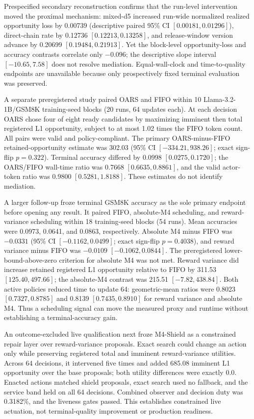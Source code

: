 \documentclass{article}
\begin{document}
Prespecified secondary reconstruction confirms that the run-level intervention moved the proximal mechanism: mixed-d5 increased run-wide normalized realized opportunity loss by 0.00739 (descriptive paired 95\% CI $[0.00181,0.01296]$), direct-chain rate by 0.12736 $[0.12213,0.13258]$, and release-window version advance by 0.20699 $[0.19484,0.21913]$. Yet the block-level opportunity-loss and accuracy contrasts correlate only $-0.096$; the descriptive slope interval $[-10.65,7.58]$ does not resolve mediation. Equal-wall-clock and time-to-quality endpoints are unavailable because only prospectively fixed terminal evaluation was preserved.

A separate preregistered study paired OARS and FIFO within 10 Llama-3.2-1B/GSM8K training-seed blocks (20 runs, 64 updates each). At each decision OARS chose four of eight ready candidates by maximizing imminent then total registered L1 opportunity, subject to at most 1.02 times the FIFO token count. All pairs were valid and policy-compliant. The primary OARS-minus-FIFO retained-opportunity estimate was 302.03 (95\% CI $[-334.21,938.26]$; exact sign-flip $p=0.322$). Terminal accuracy differed by 0.0998 $[0.0275,0.1720]$; the OARS/FIFO wall-time ratio was 0.7668 $[0.6635,0.8861]$, and the valid actor-token ratio was 0.9800 $[0.5281,1.8188]$. These estimates do not identify mediation.

A larger follow-up froze terminal GSM8K accuracy as the sole primary endpoint before opening any result. It paired FIFO, absolute-M4 scheduling, and reward-variance scheduling within 18 training-seed blocks (54 runs). Mean accuracies were 0.0973, 0.0641, and 0.0863, respectively. Absolute M4 minus FIFO was $-0.0331$ (95\% CI $[-0.1162,0.0499]$; exact sign-flip $p=0.4038$), and reward variance minus FIFO was $-0.0109$ $[-0.1062,0.0844]$. The preregistered lower-bound-above-zero criterion for absolute M4 was not met. Reward variance did increase retained registered L1 opportunity relative to FIFO by 311.53 $[125.40,497.66]$; the absolute-M4 contrast was 215.51 $[-7.82,438.84]$. Both active policies reduced time to update 64: geometric-mean ratios were 0.8023 $[0.7327,0.8785]$ and 0.8139 $[0.7435,0.8910]$ for reward variance and absolute M4. Thus a scheduling signal can move the measured proxy and runtime without establishing a terminal-accuracy gain.

An outcome-excluded live qualification next froze M4-Shield as a constrained repair layer over reward-variance proposals. Exact search could change an action only while preserving registered total and imminent reward-variance utilities. Across 64 decisions, it intervened five times and added 685.08 imminent L1 opportunity over the base proposals; both utility differences were exactly 0.0. Enacted actions matched shield proposals, exact search used no fallback, and the service band held on all 64 decisions. Combined observer and decision duty was 0.3182\%, and the liveness gates passed. This establishes constrained live actuation, not terminal-quality improvement or production readiness.
\end{document}
